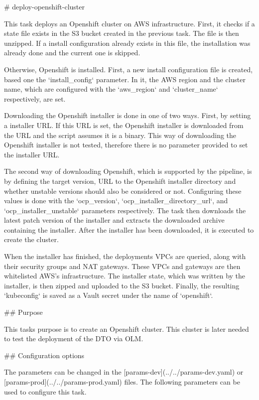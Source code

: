 # deploy-openshift-cluster

This task deploys an Openshift cluster on AWS infrastructure.
First, it checks if a state file exists in the S3 bucket created in the previous task.
The file is then unzipped.
If a install configuration already exists in this file, the installation was already done and the current one is skipped.

Otherwise, Openshift is installed.
First, a new install configuration file is created, based one the `{install_config}` parameter.
In it, the AWS region and the cluster name, which are configured with the `{aws_region}` and `{cluster_name}` respectively, are set.

Downloading the Openshift installer is done in one of two ways.
First, by setting a installer URL.
If this URL is set, the Openshift installer is downloaded from the URL and the script assumes it is a binary.
This way of downloading the Openshift installer is not tested, therefore there is no parameter provided to set the installer URL.

The second way of downloading Openshift, which is supported by the pipeline, is by defining the target version, URL to the Openshift installer directory and whether unstable versions should also be considered or not.
Configuring these values is done with the `{ocp_version}`, `{ocp_installer_directory_url}`, and `{ocp_installer_unstable}` parameters respectively.
The task then downloads the latest patch version of the installer and extracts the downloaded archive containing the installer.
After the installer has been downloaded, it is executed to create the cluster.

When the installer has finished, the deployments VPCs are queried, along with their security groups and NAT gateways.
These VPCs and gateways are then whitelisted AWS's infrastructure.
The installer state, which was written by the installer, is then zipped and uploaded to the S3 bucket.
Finally, the resulting `kubeconfig` is saved as a Vault secret under the name of `openshift`.

## Purpose

This tasks purpose is to create an Openshift cluster.
This cluster is later needed to test the deployment of the DTO via OLM.

## Configuration options

The parameters can be changed in the [params-dev](../../params-dev.yaml) or [params-prod](../../params-prod.yaml) files.
The following parameters can be used to configure this task.

